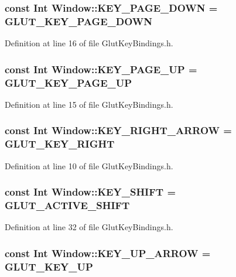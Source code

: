 \subsubsection{\setlength{\rightskip}{0pt plus 5cm}const {\bf Int} Window::KEY\_\-PAGE\_\-DOWN = GLUT\_\-KEY\_\-PAGE\_\-DOWN\hspace{0.3cm}{\tt  [static]}}\label{classdg_1_1Window_p8}




Definition at line 16 of file Glut\-Key\-Bindings.h.
\subsubsection{\setlength{\rightskip}{0pt plus 5cm}const {\bf Int} Window::KEY\_\-PAGE\_\-UP = GLUT\_\-KEY\_\-PAGE\_\-UP\hspace{0.3cm}{\tt  [static]}}\label{classdg_1_1Window_p7}




Definition at line 15 of file Glut\-Key\-Bindings.h.
\subsubsection{\setlength{\rightskip}{0pt plus 5cm}const {\bf Int} Window::KEY\_\-RIGHT\_\-ARROW = GLUT\_\-KEY\_\-RIGHT\hspace{0.3cm}{\tt  [static]}}\label{classdg_1_1Window_p2}




Definition at line 10 of file Glut\-Key\-Bindings.h.
\subsubsection{\setlength{\rightskip}{0pt plus 5cm}const {\bf Int} Window::KEY\_\-SHIFT = GLUT\_\-ACTIVE\_\-SHIFT\hspace{0.3cm}{\tt  [static]}}\label{classdg_1_1Window_p23}




Definition at line 32 of file Glut\-Key\-Bindings.h.
\subsubsection{\setlength{\rightskip}{0pt plus 5cm}const {\bf Int} Window::KEY\_\-UP\_\-ARROW = GLUT\_\-KEY\_\-UP\hspace{0.3cm}{\tt  [static]}}\label{classdg_1_1Window_p3}




